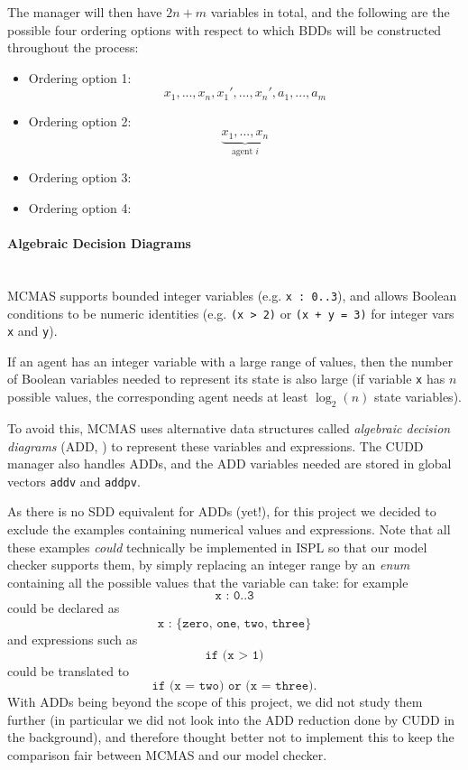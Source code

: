 \documentclass[12]{article}
\newcommand{\myparagraph}[1]{\paragraph{#1}\mbox{}\\}
\begin{document}
The manager will then have $2n + m$ variables in total, and the following are the possible four ordering options with respect to which BDDs will be constructed throughout the process:
\begin{itemize}
\item Ordering option 1:
$$x_1, ..., x_n, x_1', ..., x_n', a_1, ..., a_m$$
\item Ordering option 2:
\[
\underbrace{x_1, ..., x_n}_{\text{agent $i$}}
\]
\item Ordering option 3:

\item Ordering option 4:
\end{itemize}

\myparagraph{Algebraic Decision Diagrams}

MCMAS supports bounded integer variables (e.g. \texttt{x : 0..3}), and allows Boolean conditions to be numeric identities (e.g. \texttt{(x > 2)} or \texttt{(x + y = 3)} for integer vars \texttt{x} and \texttt{y}). 

If an agent has an integer variable with a large range of values, then the number of Boolean variables needed to represent its state is also large (if variable \texttt{x} has $n$ possible values, the corresponding agent needs at least $\log_2(n)$ state variables). 

To avoid this, MCMAS uses alternative data structures called \textit{algebraic decision diagrams} (ADD, \cite{add}) to represent these variables and expressions. The CUDD manager also handles ADDs, and the ADD variables needed are stored in global vectors \texttt{addv} and \texttt{addpv}.

As there is no SDD equivalent for ADDs (yet!), for this project we decided to exclude the examples containing numerical values and expressions. 
Note that all these examples \textit{could} technically be implemented in ISPL so that our model checker supports them, by simply replacing an integer range by an \textit{enum} containing all the possible values that the variable can take: for example 
$$\texttt{x : 0..3} $$
could be declared as $$\texttt{x : \{zero, one, two, three\}}$$
and expressions such as $$\texttt{if (x > 1)}$$ could be translated to $$\texttt{if (x = two) or (x = three)}.$$
With ADDs being beyond the scope of this project, we did not study them further (in particular we did not look into the ADD reduction done by CUDD in the background), and therefore thought better not to implement this to keep the comparison fair between MCMAS and our model checker. 
\end{document}
